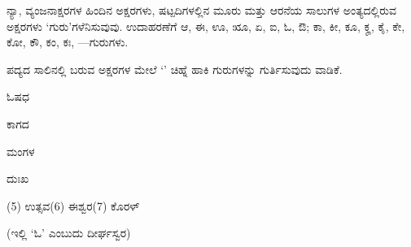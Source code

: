 \kbvcontinued ನ್ಯಾ, ವ್ಯಂಜನಾಕ್ಷರಗಳ ಹಿಂದಿನ ಅಕ್ಷರಗಳು, ಷಟ್ಪದಿಗಳಲ್ಲಿನ ಮೂರು ಮತ್ತು ಆರನೆಯ ಸಾಲುಗಳ ಅಂತ್ಯದಲ್ಲಿರುವ ಅಕ್ಷರಗಳು ‘ಗುರು’ಗಳೆನಿಸುವುವು. ಉದಾಹರಣೆಗೆ ಆ, ಈ, ಊ, ೠ, ಏ, ಐ, ಓ, ಔ; ಕಾ, ಕೀ, ಕೂ, ಕೄ, ಕೈ, ಕೇ, ಕೋ, ಕೌ, ಕಂ, ಕಃ, —ಗುರುಗಳು.\par

\indent ಪದ್ಯದ ಸಾಲಿನಲ್ಲಿ ಬರುವ ಅಕ್ಷರಗಳ ಮೇಲೆ ‘\guru{}’ ಚಿಹ್ನೆ ಹಾಕಿ ಗುರುಗಳನ್ನು ಗುರ್ತಿಸುವುದು ವಾಡಿಕೆ.\par

\vspace{3pt plus 2pt}\noindent\hspace*{1.2em}\par\vspace{1pt}

\vspace{2.5pt plus 3pt minus 0.5pt}\noindent\hspace*{1.2em}\hspace{0.55em}ಓಷಧ\par

\vspace{2.5pt plus 3pt minus 0.5pt}\noindent\hspace*{1.2em}\hspace{0.55em}ಕಾಗದ\par

\vspace{2.5pt plus 3pt minus 0.5pt}\noindent\hspace*{1.2em}\hspace{0.55em}ಮಂಗಳ\par

\vspace{2.5pt plus 3pt minus 0.5pt}\noindent\hspace*{1.2em}\hspace{0.55em}ದುಃಖ\par

\vspace{2pt plus 2pt}\noindent\hspace*{1.5em}(5) ಉತ್ಸವ\hfill (6) ಈಶ್ವರ\hfill (7) ಕೊರಳ್\hspace*{1.5em}\par\vspace{2pt plus 2pt}

\vspace{2.5pt plus 3pt minus 0.5pt}\noindent\hspace*{1.2em}\hspace{0.55em}\guru{}\laghu{}\laghu{} (ಇಲ್ಲಿ ‘ಓ’ ಎಂಬುದು ದೀರ್ಘಸ್ವರ)\par

